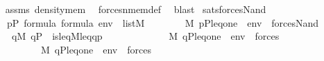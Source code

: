 \begin{isabellebody}
%
\isadelimproof
\ \ %
\endisadelimproof
%
\isatagproof
{}\isamarkupfalse%
\ assms\ density{\isacharunderscore}{\kern0pt}mem\ \isamarkupfalse%
\ forces{\isacharunderscore}{\kern0pt}nmem{\isacharunderscore}{\kern0pt}def\ \isamarkupfalse%
\ blast%
\endisatagproof
{\isafoldproof}%
%
\isadelimproof
\isanewline
%
\endisadelimproof
\isanewline
\isanewline
\isanewline
\isanewline
\isanewline
{}\isamarkupfalse%
\ sats{\isacharunderscore}{\kern0pt}forces{\isacharunderscore}{\kern0pt}Nand{\isacharprime}{\kern0pt}{\isacharcolon}{\kern0pt}\isanewline
\ \ \isanewline
\ \ \ \ {\isachardoublequoteopen}p{\isasymin}P{\isachardoublequoteclose}\ {\isachardoublequoteopen}{\isasymphi}{\isasymin}formula{\isachardoublequoteclose}\ {\isachardoublequoteopen}{\isasympsi}{\isasymin}formula{\isachardoublequoteclose}\ {\isachardoublequoteopen}env\ {\isasymin}\ list{\isacharparenleft}{\kern0pt}M{\isacharparenright}{\kern0pt}{\isachardoublequoteclose}\ \isanewline
\ \ \isanewline
\ \ \ \ {\isachardoublequoteopen}M{\isacharcomma}{\kern0pt}\ {\isacharbrackleft}{\kern0pt}p{\isacharcomma}{\kern0pt}P{\isacharcomma}{\kern0pt}leq{\isacharcomma}{\kern0pt}one{\isacharbrackright}{\kern0pt}\ {\isacharat}{\kern0pt}\ env\ {\isasymTurnstile}\ forces{\isacharparenleft}{\kern0pt}Nand{\isacharparenleft}{\kern0pt}{\isasymphi}{\isacharcomma}{\kern0pt}{\isasympsi}{\isacharparenright}{\kern0pt}{\isacharparenright}{\kern0pt}\ {\isasymlongleftrightarrow}\ \isanewline
\ \ \ \ \ {\isasymnot}{\isacharparenleft}{\kern0pt}{\isasymexists}q{\isasymin}M{\isachardot}{\kern0pt}\ q{\isasymin}P\ {\isasymand}\ is{\isacharunderscore}{\kern0pt}leq{\isacharparenleft}{\kern0pt}{\isacharhash}{\kern0pt}{\isacharhash}{\kern0pt}M{\isacharcomma}{\kern0pt}leq{\isacharcomma}{\kern0pt}q{\isacharcomma}{\kern0pt}p{\isacharparenright}{\kern0pt}\ {\isasymand}\ \isanewline
\ \ \ \ \ \ \ \ \ \ \ M{\isacharcomma}{\kern0pt}\ {\isacharbrackleft}{\kern0pt}q{\isacharcomma}{\kern0pt}P{\isacharcomma}{\kern0pt}leq{\isacharcomma}{\kern0pt}one{\isacharbrackright}{\kern0pt}\ {\isacharat}{\kern0pt}\ env\ {\isasymTurnstile}\ forces{\isacharparenleft}{\kern0pt}{\isasymphi}{\isacharparenright}{\kern0pt}\ {\isasymand}\ \isanewline
\ \ \ \ \ \ \ \ \ \ \ M{\isacharcomma}{\kern0pt}\ {\isacharbrackleft}{\kern0pt}q{\isacharcomma}{\kern0pt}P{\isacharcomma}{\kern0pt}leq{\isacharcomma}{\kern0pt}one{\isacharbrackright}{\kern0pt}\ {\isacharat}{\kern0pt}\ env\ {\isasymTurnstile}\ forces{\isacharparenleft}{\kern0pt}{\isasympsi}{\isacharparenright}{\kern0pt}{\isacharparenright}{\kern0pt}{\isachardoublequoteclose}\isanewline

\end{isabellebody}
